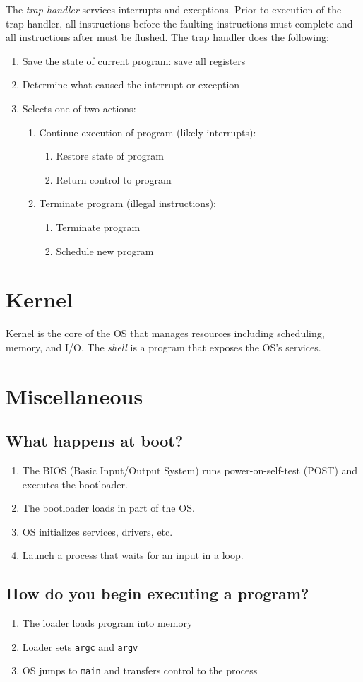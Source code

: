 The \emph{trap handler} services interrupts and exceptions. Prior to execution of the trap handler, all instructions before the faulting instructions must complete and all instructions after must be flushed. 
The trap handler does the following:
\begin{enumerate}
    \item Save the state of current program: save all registers
    \item Determine what caused the interrupt or exception
    \item Selects one of two actions:
    \begin{enumerate}
        \item Continue execution of program (likely interrupts):
        \begin{enumerate}
            \item Restore state of program
            \item Return control to program
        \end{enumerate}
        \item Terminate program (illegal instructions):
        \begin{enumerate}
            \item Terminate program
            \item Schedule new program
        \end{enumerate}
    \end{enumerate}
\end{enumerate}

\section{Kernel}
Kernel is the core of the OS that manages resources including scheduling, memory, and I/O. The \emph{shell} is a program that exposes the OS's services.

\section{Miscellaneous}

\subsection{What happens at boot?}
\begin{enumerate}
	\item The BIOS (Basic Input/Output System) runs power-on-self-test (POST) and executes the bootloader.
	\item The bootloader loads  in part of the OS.
	\item OS initializes services, drivers, etc.
	\item Launch a process that waits for an input in a loop.
\end{enumerate}

\subsection{How do you begin executing a program?}
\begin{enumerate}
    \item The loader loads program into memory
    \item Loader sets \texttt{argc} and \texttt{argv}
    \item OS jumps to \texttt{main} and transfers control to the process
\end{enumerate}